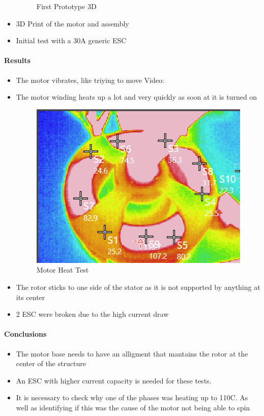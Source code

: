 \documentclass{article}
\begin{document}
\begin{itemize}
\begin{figure}[H]
        \caption{First Prototype 3D}
    \end{figure}
    \item 3D Print of the motor and assembly
    \item Initial test with a 30A generic ESC
 \end{itemize}
\paragraph{Results}
\begin{itemize}
    \item The motor vibrates, like triying to move
    Video: 
    \item The motor winding heats up a lot and very quickly as soon at it is turned on
    
    \begin{figure}[H]
        \centering
        \includegraphics[width=\linewidth]{Images/Motor/MotorHeat1.png}
        \caption{Motor Heat Test}
    \end{figure}
    \item The rotor sticks to one side of the stator as it is not supported by anything at its center
    \item 2 ESC were broken due to the high current draw
\end{itemize}
\paragraph{Conclusions}
\begin{itemize}
    \item The motor base needs to have an alligment that mantains the rotor at the center of the structure
    \item An ESC with higher current capacity is needed for these tests.
    \item It is necessary to check why one of the phases was heating up to 110\degree C. As well as identifying if this was the cause of the motor not being able to spin
\end{itemize}
\end{document}
